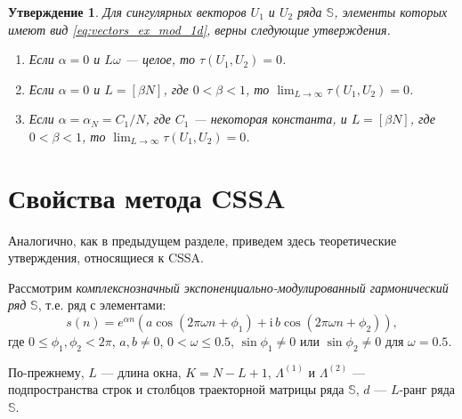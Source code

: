 \documentclass[specialist,
               substylefile = spbu.rtx,
               subf,href,colorlinks=true, 12pt]{disser}
\newcommand{\I}{\mathrm{i}}
\newtheorem{Th}{Утверждение}
\begin{document}
\begin{Th}  \cite[Теорема 1]{Zhornikova2016} \label{th:th_tau_1d}
Для сингулярных векторов $U_1$ и $U_2$  ряда $\mathbb{S}$, элементы которых имеют вид \eqref{eq:vectors_ex_mod_1d}, верны следующие утверждения.
\begin{enumerate}
\item \label{th:re_tau1}
Если $\alpha=0$ и $L\omega$ --- целое, то $\tau(U_1, U_2)=0$.
\item \label{th:re_tau2}
Если $\alpha = 0$ и  $L=[\beta N]$, где $0<\beta<1$, то $\lim_{L \rightarrow \infty}\tau(U_1, U_2) = 0$.
\item  \label{th:re_tau3}
Если $\alpha = \alpha_N = C_1/N$, где $C_1$ --- некоторая константа, и $L=[\beta N]$, где $0<\beta<1$, то $\lim_{L \rightarrow \infty}\tau(U_1, U_2) = 0$.
\end{enumerate}
\end{Th}

\section{Свойства метода CSSA}
\label{sec:cssa_theory}
Аналогично, как в предыдущем разделе, приведем здесь теоретические утверждения, относящиеся к CSSA.

Рассмотрим \textit{комплекснозначный экспоненциально-модулированный гармонический ряд} $\mathbb{S}$, т.е. ряд с элементами:
\begin{equation} \label{eq:complex_exmodgarm}
 s(n) = e^{\alpha n} (a\cos(2\pi\omega n + \phi_1) + \I \,b\cos(2\pi\omega n + \phi_2)),
\end{equation}
где $0 \leqslant\phi_1, \phi_2 < 2\pi$, $a, b \not = 0$, $0<\omega \leqslant 0.5$, $\sin \phi_1 \not = 0$ или $\sin \phi_2 \not = 0$ для $\omega = 0.5$.

По-прежнему, $L$ --- длина окна, $K=N-L+1$, $\Lambda^{(1)}$ и $\Lambda^{(2)}$ --- подпространства строк и столбцов траекторной матрицы ряда $\mathbb{S}$, $d$ --- $L$-ранг ряда $\mathbb{S}$.

\end{document}
